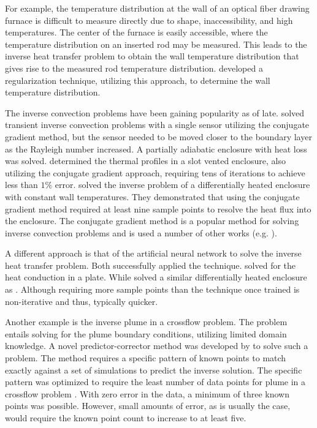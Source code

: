 \documentclass[preprint,12pt]{elsarticle}
\begin{document}
For example, the temperature distribution at the wall of an optical fiber drawing furnace is difficult to measure directly due to shape, inaccessibility, and high temperatures.  The center of the furnace is easily accessible, where the temperature distribution on an inserted rod may be measured. This leads to the inverse heat transfer problem to obtain the wall temperature distribution that gives rise to the measured rod temperature distribution.   developed a regularization technique, utilizing this approach, to determine the wall temperature distribution.

The inverse convection problems have been gaining popularity as of late.   solved transient inverse convection problems with a single sensor utilizing the conjugate gradient method, but the sensor needed to be moved closer to the boundary layer as the Rayleigh number increased.  A partially adiabatic enclosure with heat loss was solved.   determined the thermal profiles in a slot vented enclosure, also utilizing the conjugate gradient approach, requiring tens of iterations to achieve less than $1\%$ error.   solved the inverse problem of a differentially heated enclosure with constant wall temperatures.  They demonstrated that using the conjugate gradient method required at least nine sample points to resolve the heat flux into the enclosure.  The conjugate gradient method is a popular method for solving inverse convection problems and is used a number of other works (e.g. \cite{inversecgm,inversesource,inverseenclosure,liu,inverseconvrad}).

A different approach is that of the artificial neural network to solve the inverse heat transfer problem.  Both \citet{conductionneural,inverseneuralnet} successfully applied the technique.   solved for the heat conduction in a plate.  While \citet{inverseneuralnet} solved a similar differentially heated enclosure as \cite{inverseconvrad}.  Although requiring more sample points than \cite{inverseconvrad} the technique once trained is non-iterative and thus, typically quicker.

Another example is the inverse plume in a crossflow problem.  The problem entails solving for the plume boundary conditions, utilizing limited domain knowledge.  A novel predictor-corrector method was developed by \citet{ijhmt1} to solve such a problem.  The method requires a specific pattern of known points to match exactly against a set of simulations to predict the inverse solution.  The specific pattern was optimized to require the least number of data points for plume in a crossflow problem \cite{ijhmt2}.  With zero error in the data, a minimum of three known points was possible.  However, small amounts of error, as is usually the case, would require the known point count to increase to at least five.
\end{document}
